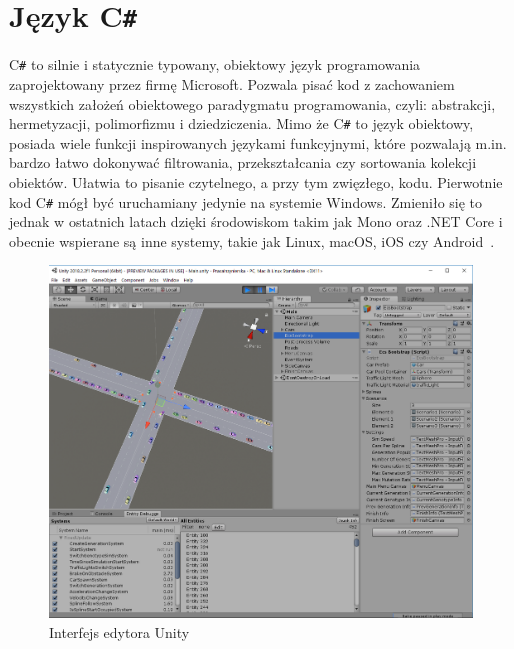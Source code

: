 \section*{Język C\texttt{\#}}
C\texttt{\#} to silnie i statycznie typowany, obiektowy język programowania zaprojektowany przez firmę Microsoft. Pozwala pisać kod z zachowaniem wszystkich założeń obiektowego paradygmatu programowania, czyli: abstrakcji, hermetyzacji, polimorfizmu i dziedziczenia. Mimo że C\texttt{\#} to język obiektowy, posiada wiele funkcji inspirowanych językami funkcyjnymi, które pozwalają m.in. bardzo łatwo dokonywać filtrowania, przekształcania czy sortowania kolekcji obiektów. Ułatwia to pisanie czytelnego, a przy tym zwięzłego, kodu. Pierwotnie kod C\texttt{\#} mógł być uruchamiany jedynie na systemie Windows. Zmieniło się to jednak w ostatnich latach dzięki środowiskom takim jak Mono oraz .NET Core i obecnie wspierane są inne systemy, takie jak Linux, macOS, iOS czy Android~\cite{Albahari2017}.
\begin{figure}[h!]
	\centering
	\includegraphics[width=1\linewidth]{unity}
	\caption[Interfejs edytora Unity]{Interfejs edytora Unity}
	\label{fig:unity}
\end{figure}
